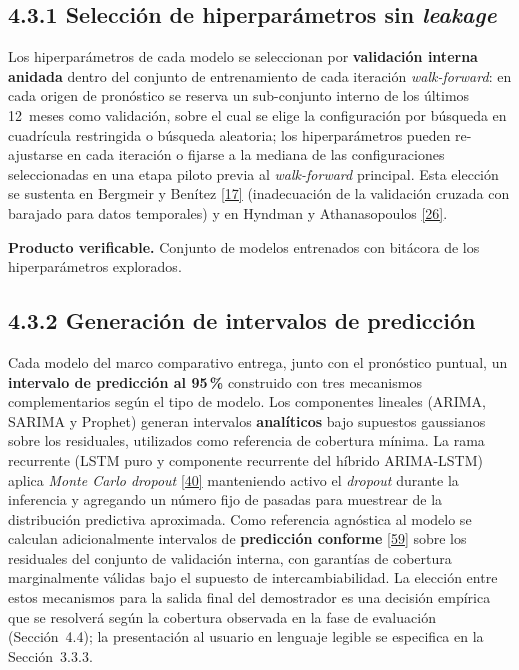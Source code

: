 \documentclass[12pt,letterpaper]{report}
\newcommand{\cita}[1]{\hyperref[bib:#1]{[#1]}}
\begin{document}
\subsection*{4.3.1 Selección de hiperparámetros sin \textit{leakage}}

Los hiperparámetros de cada modelo se seleccionan por \textbf{validación interna anidada} dentro del conjunto de entrenamiento de cada iteración \textit{walk-forward}: en cada origen de pronóstico se reserva un sub-conjunto interno de los últimos 12~meses como validación, sobre el cual se elige la configuración por búsqueda en cuadrícula restringida o búsqueda aleatoria; los hiperparámetros pueden re-ajustarse en cada iteración o fijarse a la mediana de las configuraciones seleccionadas en una etapa piloto previa al \textit{walk-forward} principal. Esta elección se sustenta en Bergmeir y Benítez \cita{17} (inadecuación de la validación cruzada con barajado para datos temporales) y en Hyndman y Athanasopoulos \cita{26}.

\textbf{Producto verificable.} Conjunto de modelos entrenados con bitácora de los hiperparámetros explorados.

\subsection*{4.3.2 Generación de intervalos de predicción}

Cada modelo del marco comparativo entrega, junto con el pronóstico puntual, un \textbf{intervalo de predicción al 95\,\%} construido con tres mecanismos complementarios según el tipo de modelo. Los componentes lineales (ARIMA, SARIMA y Prophet) generan intervalos \textbf{analíticos} bajo supuestos gaussianos sobre los residuales, utilizados como referencia de cobertura mínima. La rama recurrente (LSTM puro y componente recurrente del híbrido ARIMA-LSTM) aplica \textit{Monte Carlo dropout} \cita{40} manteniendo activo el \textit{dropout} durante la inferencia y agregando un número fijo de pasadas para muestrear de la distribución predictiva aproximada. Como referencia agnóstica al modelo se calculan adicionalmente intervalos de \textbf{predicción conforme} \cita{59} sobre los residuales del conjunto de validación interna, con garantías de cobertura marginalmente válidas bajo el supuesto de intercambiabilidad. La elección entre estos mecanismos para la salida final del demostrador es una decisión empírica que se resolverá según la cobertura observada en la fase de evaluación (Sección~4.4); la presentación al usuario en lenguaje legible se especifica en la Sección~3.3.3.
\end{document}
